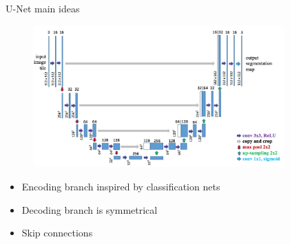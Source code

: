 \documentclass[xcolor=pdftex,dvipsnames,table,mathserif]{beamer}
\begin{document}
\begin{frame}{U-Net main ideas}

      \begin{figure}
        \includegraphics[width=0.86\textwidth]{unet_lo}
      \end{figure}


      \begin{itemize}
      \item Encoding branch inspired by classification nets
      \item Decoding branch is symmetrical
      \item Skip connections
      \end{itemize}

\end{frame}





\end{document}
